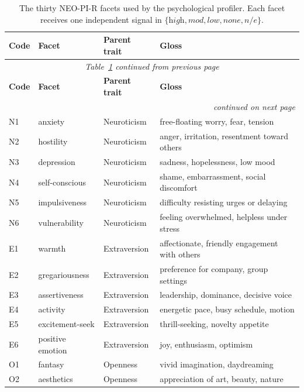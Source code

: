 \documentclass[../main.tex]{subfiles}
\begin{document}
\begin{longtable}{p{1.2cm}p{2.8cm}p{3.6cm}p{5.4cm}}
  \caption{The thirty NEO-PI-R facets used by the psychological profiler.
  Each facet receives one independent signal
  in $\{\textit{high}, \textit{mod}, \textit{low}, \textit{none},
  \textit{n/e}\}$.}
  \label{tab:facets}\\
  \toprule
  \textbf{Code} & \textbf{Facet} & \textbf{Parent trait} & \textbf{Gloss} \\
  \midrule
  \endfirsthead
  \multicolumn{4}{c}{\textit{Table~\ref{tab:facets} continued from previous page}}\\
  \toprule
  \textbf{Code} & \textbf{Facet} & \textbf{Parent trait} & \textbf{Gloss} \\
  \midrule
  \endhead
  \midrule \multicolumn{4}{r}{\textit{continued on next page}}\\
  \endfoot
  \bottomrule
  \endlastfoot
  N1 & anxiety           & Neuroticism       & free-floating worry, fear, tension \\
  N2 & hostility         & Neuroticism       & anger, irritation, resentment toward others \\
  N3 & depression        & Neuroticism       & sadness, hopelessness, low mood \\
  N4 & self-conscious    & Neuroticism       & shame, embarrassment, social discomfort \\
  N5 & impulsiveness     & Neuroticism       & difficulty resisting urges or delaying \\
  N6 & vulnerability     & Neuroticism       & feeling overwhelmed, helpless under stress \\
  E1 & warmth            & Extraversion      & affectionate, friendly engagement with others \\
  E2 & gregariousness    & Extraversion      & preference for company, group settings \\
  E3 & assertiveness     & Extraversion      & leadership, dominance, decisive voice \\
  E4 & activity          & Extraversion      & energetic pace, busy schedule, motion \\
  E5 & excitement-seek   & Extraversion      & thrill-seeking, novelty appetite \\
  E6 & positive emotion  & Extraversion      & joy, enthusiasm, optimism \\
  O1 & fantasy           & Openness          & vivid imagination, daydreaming \\
  O2 & aesthetics        & Openness          & appreciation of art, beauty, nature \\

\end{longtable}
\end{document}
